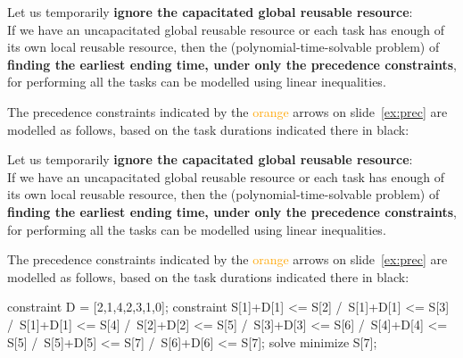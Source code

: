 \documentclass{cons-beamer}
\begin{document}
\begin{flashcardcpmpy}
	\begin{frame}%
		Let us temporarily \textbf{ ignore the capacitated global reusable resource}: \\
		If we have an uncapacitated global reusable resource or each task
		has enough of its own local reusable resource, then the
		(polynomial-time-solvable problem) of \textbf{finding the earliest ending
			time, under only the precedence constraints}, for performing all the
		tasks can be modelled using linear inequalities.
		\vfill
		
		\begin{example}[continued]
			The precedence constraints indicated by the
			\textcolor{Orange}{orange} arrows on slide~\ref{ex:prec} are
			modelled as follows, based on the task durations indicated there
			in black: 
			
			
		\end{example}
	\end{frame}
\end{flashcardcpmpy}
\begin{flashcardminizinc}
	\begin{frame}[fragile]%
		Let us temporarily \textbf{ ignore the capacitated global reusable resource}: \\
		If we have an uncapacitated global reusable resource or each task
		has enough of its own local reusable resource, then the
		(polynomial-time-solvable problem) of \textbf{finding the earliest ending
			time, under only the precedence constraints}, for performing all the
		tasks can be modelled using linear inequalities.
		\vfill
		
		\begin{example}[continued]
			The precedence constraints indicated by the
			\textcolor{Orange}{orange} arrows on slide~\ref{ex:prec} are
			modelled as follows, based on the task durations indicated there
			in black: 
			
			\begin{mzn}
				constraint D = [2,1,4,2,3,1,0];
				constraint S[1]+D[1] <= S[2] /\ S[1]+D[1] <= S[3]
				/\ S[1]+D[1] <= S[4] /\ S[2]+D[2] <= S[5]
				/\ S[3]+D[3] <= S[6] /\ S[4]+D[4] <= S[5]
				/\ S[5]+D[5] <= S[7] /\ S[6]+D[6] <= S[7];
				solve minimize S[7];
			\end{mzn}
		\end{example}
	\end{frame}
\end{flashcardminizinc}
\fi
\end{document}
